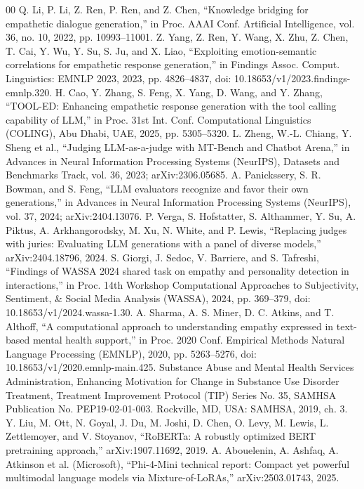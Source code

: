 \documentclass[conference,a4paper]{IEEEtran}
\begin{document}
\begin{thebibliography}{00}
 Q. Li, P. Li, Z. Ren, P. Ren, and Z. Chen, ``Knowledge bridging for empathetic dialogue generation,'' in Proc. AAAI Conf. Artificial Intelligence, vol. 36, no. 10, 2022, pp. 10993--11001.
 Z. Yang, Z. Ren, Y. Wang, X. Zhu, Z. Chen, T. Cai, Y. Wu, Y. Su, S. Ju, and X. Liao, ``Exploiting emotion-semantic correlations for empathetic response generation,'' in Findings Assoc. Comput. Linguistics: EMNLP 2023, 2023, pp. 4826--4837, doi: 10.18653/v1/2023.findings-emnlp.320.
 H. Cao, Y. Zhang, S. Feng, X. Yang, D. Wang, and Y. Zhang, ``TOOL-ED: Enhancing empathetic response generation with the tool calling capability of LLM,'' in Proc. 31st Int. Conf. Computational Linguistics (COLING), Abu Dhabi, UAE, 2025, pp. 5305--5320.
 L. Zheng, W.-L. Chiang, Y. Sheng et al., ``Judging LLM-as-a-judge with MT-Bench and Chatbot Arena,'' in Advances in Neural Information Processing Systems (NeurIPS), Datasets and Benchmarks Track, vol. 36, 2023; arXiv:2306.05685.
 A. Panickssery, S. R. Bowman, and S. Feng, ``LLM evaluators recognize and favor their own generations,'' in Advances in Neural Information Processing Systems (NeurIPS), vol. 37, 2024; arXiv:2404.13076.
 P. Verga, S. Hofstatter, S. Althammer, Y. Su, A. Piktus, A. Arkhangorodsky, M. Xu, N. White, and P. Lewis, ``Replacing judges with juries: Evaluating LLM generations with a panel of diverse models,'' arXiv:2404.18796, 2024.
 S. Giorgi, J. Sedoc, V. Barriere, and S. Tafreshi, ``Findings of WASSA 2024 shared task on empathy and personality detection in interactions,'' in Proc. 14th Workshop Computational Approaches to Subjectivity, Sentiment, \& Social Media Analysis (WASSA), 2024, pp. 369--379, doi: 10.18653/v1/2024.wassa-1.30.
 A. Sharma, A. S. Miner, D. C. Atkins, and T. Althoff, ``A computational approach to understanding empathy expressed in text-based mental health support,'' in Proc. 2020 Conf. Empirical Methods Natural Language Processing (EMNLP), 2020, pp. 5263--5276, doi: 10.18653/v1/2020.emnlp-main.425.
 Substance Abuse and Mental Health Services Administration, Enhancing Motivation for Change in Substance Use Disorder Treatment, Treatment Improvement Protocol (TIP) Series No. 35, SAMHSA Publication No. PEP19-02-01-003. Rockville, MD, USA: SAMHSA, 2019, ch. 3.
 Y. Liu, M. Ott, N. Goyal, J. Du, M. Joshi, D. Chen, O. Levy, M. Lewis, L. Zettlemoyer, and V. Stoyanov, ``RoBERTa: A robustly optimized BERT pretraining approach,'' arXiv:1907.11692, 2019.
 A. Abouelenin, A. Ashfaq, A. Atkinson et al. (Microsoft), ``Phi-4-Mini technical report: Compact yet powerful multimodal language models via Mixture-of-LoRAs,'' arXiv:2503.01743, 2025.

\end{thebibliography}
\end{document}
